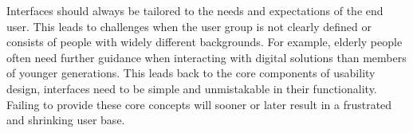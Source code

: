 \blankLine

Interfaces should always be tailored to the needs and expectations of the end user. This leads to challenges when the user group is not clearly defined or consists of people with widely different backgrounds. For example, elderly people often need further guidance when interacting with digital solutions than members of younger generations. This leads back to the core components of usability design, interfaces need to be simple and unmistakable in their functionality. Failing to provide these core concepts will sooner or later result in a frustrated and shrinking user base. 
\autocite{Paul:UIUXIntroduction}

\newpage